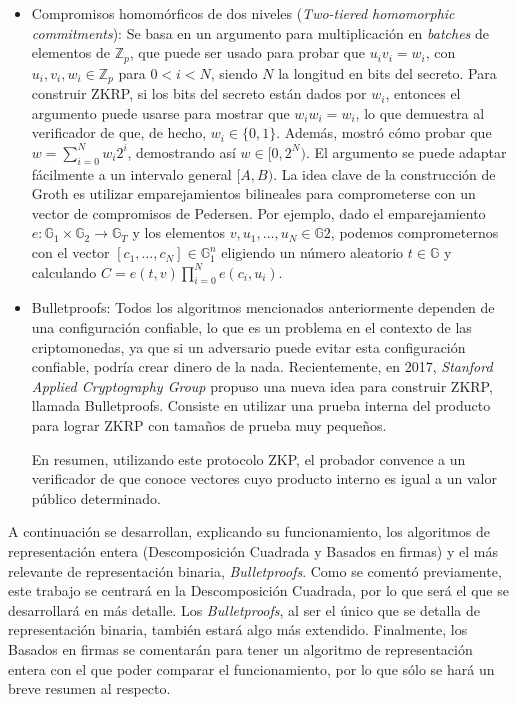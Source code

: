 \begin{itemize}
\begin{itemize}
        \item Compromisos homomórficos de dos niveles (\emph{Two-tiered homomorphic commitments}):
        Se basa en un argumento para multiplicación en \emph{batches} de elementos de $\mathbb{Z}_{p}$, que puede ser usado para probar que $u_{i}v_{i} = w_{i}$, con $u_{i}, v_{i}, w_{i} \in \mathbb{Z}_{p}$ para $0 < i < N$, siendo $N$ la longitud en bits del secreto. Para construir ZKRP, si los bits del secreto están dados por $w_{i}$, entonces el argumento puede usarse para mostrar que $w_{i}w_{i} = w_{i}$, lo que demuestra al verificador de que, de hecho, $w_{i} \in \{0, 1\}$. Además, mostró cómo probar que $w = \sum_{i=0}^{N} w_{i} 2^{i}$, demostrando así $w \in [0,2^{N})$. El argumento se puede adaptar fácilmente a un intervalo general $[A, B)$. La idea clave de la construcción de Groth es utilizar emparejamientos bilineales para comprometerse con un vector de compromisos de Pedersen. Por ejemplo, dado el emparejamiento $e: \mathbb{G}_{1} \times \mathbb{G}_{2} \to \mathbb{G}_{T}$ y los elementos $v, u_{1}, \dots, u_{N} \in \mathbb{G}{2}$, podemos comprometernos con el vector $[c_{1}, \dots, c_{N}] \in \mathbb{G}_{1}^{n}$ eligiendo un número aleatorio $t \in \mathbb{G}$ y calculando $C = e(t, v) \prod_{i=0}^{N} e(c_{i}, u_{i})$.
        
        \item Bulletproofs: Todos los algoritmos mencionados anteriormente dependen de una configuración confiable, lo que es un problema en el contexto de las criptomonedas, ya que si un adversario puede evitar esta configuración confiable, podría crear dinero de la nada. Recientemente, en 2017, \emph{Stanford Applied Cryptography Group} propuso una nueva idea para construir ZKRP, llamada Bulletproofs. Consiste en utilizar una prueba interna del producto para lograr ZKRP con tamaños de prueba muy pequeños.
        
        En resumen, utilizando este protocolo ZKP, el probador convence a un verificador de que conoce vectores cuyo producto interno es igual a un valor público determinado.
    \end{itemize}
\end{itemize}

A continuación se desarrollan, explicando su funcionamiento, los algoritmos de representación entera (Descomposición Cuadrada y Basados en firmas) y el más relevante de representación binaria, \emph{Bulletproofs}. Como se comentó previamente, este trabajo se centrará en la Descomposición Cuadrada, por lo que será el que se desarrollará en más detalle. Los \emph{Bulletproofs}, al ser el único que se detalla de representación binaria, también estará algo más extendido. Finalmente, los Basados en firmas se comentarán para tener un algoritmo de representación entera con el que poder comparar el funcionamiento, por lo que sólo se hará un breve resumen al respecto.

